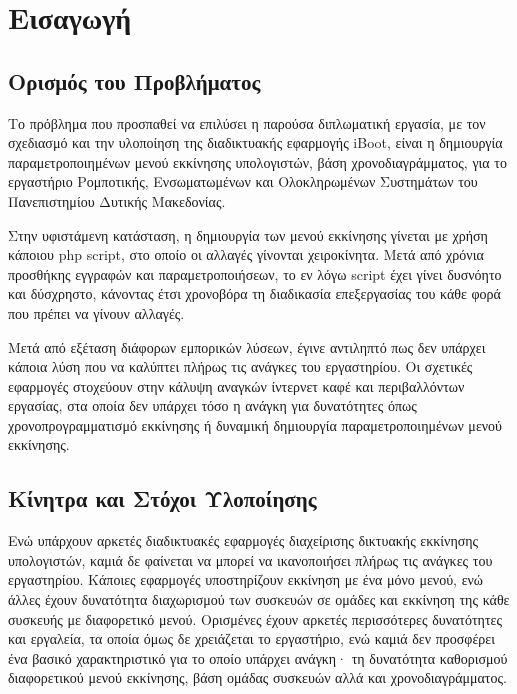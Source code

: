\chapter{Εισαγωγή}
\section{Ορισμός του Προβλήματος}
Το πρόβλημα που προσπαθεί να επιλύσει η παρούσα διπλωματική εργασία, με τον σχεδιασμό και την υλοποίηση της διαδικτυακής εφαρμογής iBoot, είναι η δημιουργία παραμετροποιημένων μενού εκκίνησης υπολογιστών, βάση χρονοδιαγράμματος, για το εργαστήριο Ρομποτικής, Ενσωματωμένων και Ολοκληρωμένων Συστημάτων του Πανεπιστημίου Δυτικής Μακεδονίας.

Στην υφιστάμενη κατάσταση, η δημιουργία των μενού εκκίνησης γίνεται με χρήση κάποιου php script, στο οποίο οι αλλαγές γίνονται χειροκίνητα. Μετά από χρόνια προσθήκης εγγραφών και παραμετροποιήσεων, το εν λόγω script έχει γίνει δυσνόητο και δύσχρηστο, κάνοντας έτσι χρονοβόρα τη διαδικασία επεξεργασίας του κάθε φορά που πρέπει να γίνουν αλλαγές.

Μετά από εξέταση διάφορων εμπορικών λύσεων, έγινε αντιληπτό πως δεν υπάρχει κάποια λύση που να καλύπτει πλήρως τις ανάγκες του εργαστηρίου. Οι σχετικές εφαρμογές στοχεύουν στην κάλυψη αναγκών ίντερνετ καφέ και περιβαλλόντων εργασίας, στα οποία δεν υπάρχει τόσο η ανάγκη για δυνατότητες όπως χρονοπρογραμματισμό εκκίνησης ή δυναμική δημιουργία παραμετροποιημένων μενού εκκίνησης.

\section{Κίνητρα και Στόχοι Υλοποίησης}
Ενώ υπάρχουν αρκετές διαδικτυακές εφαρμογές διαχείρισης δικτυακής εκκίνησης υπολογιστών, καμιά δε φαίνεται να μπορεί να ικανοποιήσει πλήρως τις ανάγκες του εργαστηρίου. Κάποιες εφαρμογές υποστηρίζουν εκκίνηση με ένα μόνο μενού, ενώ άλλες έχουν δυνατότητα διαχωρισμού των συσκευών σε ομάδες και εκκίνηση της κάθε συσκευής με διαφορετικό μενού. Ορισμένες έχουν αρκετές περισσότερες δυνατότητες και εργαλεία, τα οποία όμως δε χρειάζεται το εργαστήριο, ενώ καμιά δεν προσφέρει ένα βασικό χαρακτηριστικό για το οποίο υπάρχει ανάγκη· τη δυνατότητα καθορισμού διαφορετικού μενού εκκίνησης, βάση ομάδας συσκευών αλλά και χρονοδιαγράμματος.


